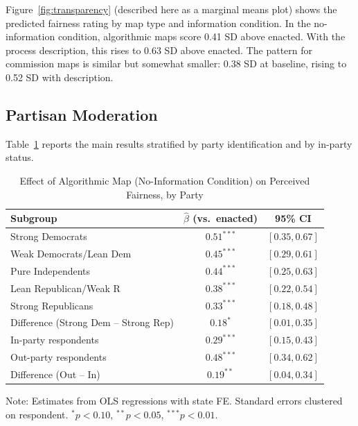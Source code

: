 Figure~\ref{fig:transparency} (described here as a marginal means plot) shows the predicted fairness rating by map type and information condition. In the no-information condition, algorithmic maps score 0.41 SD above enacted. With the process description, this rises to 0.63 SD above enacted. The pattern for commission maps is similar but somewhat smaller: 0.38 SD at baseline, rising to 0.52 SD with description.

\subsection{Partisan Moderation}

Table~\ref{tab:partisan} reports the main results stratified by party identification and by in-party status.

\begin{table}[h!]
\centering
\caption{Effect of Algorithmic Map (No-Information Condition) on Perceived Fairness, by Party}
\label{tab:partisan}
\begin{threeparttable}
\begin{tabular}{lcc}
\toprule
\textbf{Subgroup} & $\hat{\beta}$ (vs.\ enacted) & 95\% CI \\
\midrule
Strong Democrats        & $0.51^{***}$ & $[0.35, 0.67]$ \\
Weak Democrats/Lean Dem & $0.45^{***}$ & $[0.29, 0.61]$ \\
Pure Independents       & $0.44^{***}$ & $[0.25, 0.63]$ \\
Lean Republican/Weak R  & $0.38^{***}$ & $[0.22, 0.54]$ \\
Strong Republicans      & $0.33^{***}$ & $[0.18, 0.48]$ \\
\midrule
Difference (Strong Dem -- Strong Rep) & $0.18^{*}$ & $[0.01, 0.35]$ \\
\midrule
In-party respondents    & $0.29^{***}$ & $[0.15, 0.43]$ \\
Out-party respondents   & $0.48^{***}$ & $[0.34, 0.62]$ \\
Difference (Out -- In)  & $0.19^{**}$  & $[0.04, 0.34]$ \\
\bottomrule
\end{tabular}
\begin{tablenotes}
\small \item Note: Estimates from OLS regressions with state FE. Standard errors clustered on respondent. $^* p < 0.10$, $^{**} p < 0.05$, $^{***} p < 0.01$.
\end{tablenotes}
\end{threeparttable}
\end{table}

